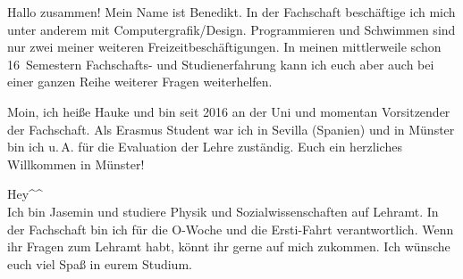 \begin{multicols}{2}
{
Hallo zusammen! Mein Name ist Benedikt. In der Fachschaft beschäftige ich mich unter anderem mit Computergrafik/Design. 
Programmieren und Schwimmen sind nur zwei meiner weiteren Freizeitbeschäftigungen. 
In meinen mittlerweile schon 16~Semestern Fachschafts- und Studienerfahrung kann ich euch aber auch bei einer ganzen Reihe weiterer Fragen weiterhelfen.
}

\vspace{-0.5cm}

{
Moin, ich heiße Hauke und bin seit 2016 an der Uni und momentan Vorsitzender der Fachschaft. Als Erasmus Student war ich in Sevilla (Spanien) und in Münster bin ich u.\,A. für die Evaluation der Lehre zuständig. 
Euch ein herzliches Willkommen in Münster!
}

\vspace{0.2cm}

{
Hey\textasciicircum\textasciicircum \\
Ich bin Jasemin und studiere Physik und Sozialwissenschaften auf Lehramt. In der Fachschaft bin ich für die O-Woche und die Ersti-Fahrt verantwortlich.
Wenn ihr Fragen zum Lehramt habt, könnt ihr gerne auf mich zukommen.
Ich wünsche euch viel Spaß in eurem Studium.
}

\vspace{-0.1cm}


\end{multicols}
